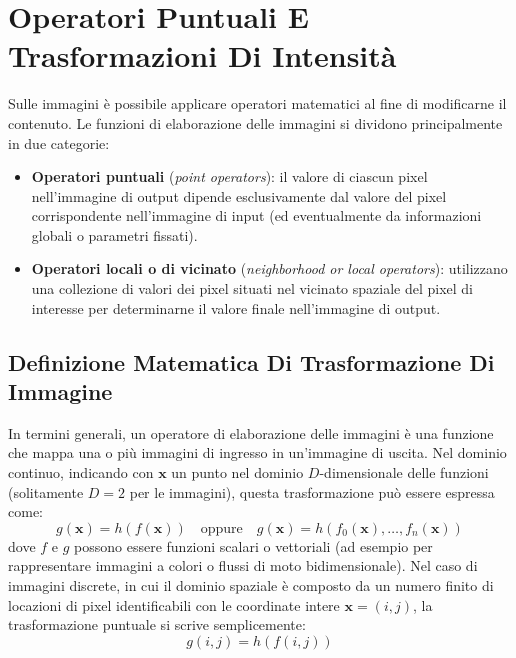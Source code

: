﻿\documentclass[11pt, a4paper]{article}
\begin{document}
\newpage

\section{Operatori Puntuali E Trasformazioni Di Intensità}

Sulle immagini è possibile applicare operatori matematici al fine di modificarne il contenuto. Le funzioni di elaborazione delle immagini si dividono principalmente in due categorie:
\begin{itemize}
    \item \textbf{Operatori puntuali} (\emph{point operators}): il valore di ciascun pixel nell'immagine di output dipende esclusivamente dal valore del pixel corrispondente nell'immagine di input (ed eventualmente da informazioni globali o parametri fissati).
    \item \textbf{Operatori locali o di vicinato} (\emph{neighborhood or local operators}): utilizzano una collezione di valori dei pixel situati nel vicinato spaziale del pixel di interesse per determinarne il valore finale nell'immagine di output.
\end{itemize}



\subsection{Definizione Matematica Di Trasformazione Di Immagine}

In termini generali, un operatore di elaborazione delle immagini è una funzione che mappa una o più immagini di ingresso in un'immagine di uscita. Nel dominio continuo, indicando con $\bm{x}$ un punto nel dominio $D$-dimensionale delle funzioni (solitamente $D=2$ per le immagini), questa trasformazione può essere espressa come:
\[ g(\bm{x}) = h(f(\bm{x})) \quad \text{oppure} \quad g(\bm{x}) = h(f_0(\bm{x}), \dots, f_n(\bm{x})) \]
dove $f$ e $g$ possono essere funzioni scalari o vettoriali (ad esempio per rappresentare immagini a colori o flussi di moto bidimensionale). Nel caso di immagini discrete, in cui il dominio spaziale è composto da un numero finito di locazioni di pixel identificabili con le coordinate intere $\bm{x} = (i, j)$, la trasformazione puntuale si scrive semplicemente:
\[ g(i, j) = h(f(i, j)) \]
\end{document}
